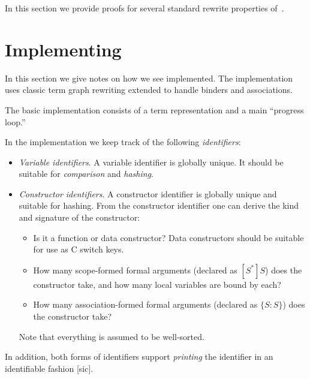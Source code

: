\documentclass[letterpaper,11pt]{article}
\begin{document}
In this section we provide proofs for several standard rewrite properties of~\hax.




\section{Implementing \hax}
\label{sec:implement}

In this section we give notes on how we see \hax implemented. The implementation uses classic term
graph rewriting extended to handle binders and associations.

The basic \hax implementation consists of a term representation and a main ``progress loop.''

\begin{definition}[identifiers]
  In the implementation we keep track of the following \emph{identifiers}:
  \begin{itemize}

  \item \emph{Variable identifiers}. A variable identifier is globally unique. It should be suitable
    for \emph{comparison} and \emph{hashing}.

  \item \emph{Constructor identifiers}. A constructor identifier is globally unique and suitable for
    hashing. From the constructor identifier one can derive the kind and signature of the
    constructor:
    \begin{itemize}
    \item Is it a function or data constructor? Data constructors should be suitable for use as C
      switch keys.
    \item How many scope-formed formal arguments (declared as $[S^*]S$) does the constructor take,
      and how many local variables are bound by each?
    \item How many association-formed formal arguments (declared as $\{S:S\}$) does the constructor
      take?
    \end{itemize}
    Note that everything is assumed to be well-sorted.

  \end{itemize}
  In addition, both forms of identifiers support \emph{printing} the identifier in an identifiable
  fashion [sic].
\end{definition}
\end{document}

